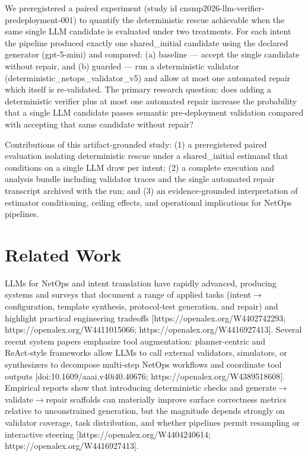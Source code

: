\documentclass[conference]{IEEEtran}
\begin{document}
We preregistered a paired experiment (study id cnsmp2026-llm-verifier-predeployment-001) to quantify the deterministic rescue achievable when the same single LLM candidate is evaluated under two treatments. For each intent the pipeline produced exactly one shared\_initial candidate using the declared generator (gpt-5-mini) and compared: (a) baseline --- accept the single candidate without repair, and (b) guarded --- run a deterministic validator (deterministic\_netops\_validator\_v5) and allow at most one automated repair which itself is re‑validated. The primary research question: does adding a deterministic verifier plus at most one automated repair increase the probability that a single LLM candidate passes semantic pre‑deployment validation compared with accepting that same candidate without repair?

Contributions of this artifact‑grounded study: (1) a preregistered paired evaluation isolating deterministic rescue under a shared\_initial estimand that conditions on a single LLM draw per intent; (2) a complete execution and analysis bundle including validator traces and the single automated repair transcript archived with the run; and (3) an evidence‑grounded interpretation of estimator conditioning, ceiling effects, and operational implications for NetOps pipelines.

\section{Related Work}
LLMs for NetOps and intent translation have rapidly advanced, producing systems and surveys that document a range of applied tasks (intent\ensuremath{\rightarrow}configuration, template synthesis, protocol‑test generation, and repair) and highlight practical engineering tradeoffs [https://openalex.org/W4402742293; https://openalex.org/W4411015066; https://openalex.org/W4416927413]. Several recent system papers emphasize tool augmentation: planner‑centric and ReAct‑style frameworks allow LLMs to call external validators, simulators, or synthesizers to decompose multi‑step NetOps workflows and coordinate tool outputs [doi:10.1609/aaai.v40i40.40676; https://openalex.org/W4389518608]. Empirical reports show that introducing deterministic checks and generate\ensuremath{\rightarrow}validate\ensuremath{\rightarrow}repair scaffolds can materially improve surface correctness metrics relative to unconstrained generation, but the magnitude depends strongly on validator coverage, task distribution, and whether pipelines permit resampling or interactive steering [https://openalex.org/W4404240614; https://openalex.org/W4416927413].
\end{document}
